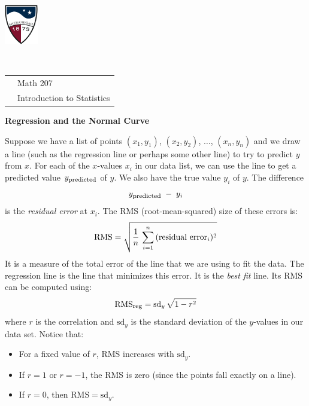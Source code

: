 \documentclass[10pt]{article}
\begin{document}
\pagestyle{empty}
\lstset{language=R, showspaces=false, showstringspaces=false}

\href{http://www.su.edu}{\includegraphics[height=1.75cm]{sulogo.eps}}
\vspace{-1.69cm}

{\small{\ }\hfill
\begin{tabular}{cl}
& Math 207\\
& Introduction to Statistics\\
\end{tabular}
}
\setlength{\baselineskip}{1.05\baselineskip}

\begin{center}
\textbf{\large  Regression and the Normal Curve}
\end{center}
\newcommand{\Z}{\hphantom{0}}
\newcommand{\VP}{\vphantom{\Large Y}}
\newcommand{\M}{\hphantom{$-$}}

Suppose we have a list of points $(x_1, y_1)$, $(x_2, y_2)$, $\dots$, $(x_n, y_n)$
and we draw a line (such as the regression line or perhaps some other line) to 
try to predict $y$ from $x$.  
For each of the $x$-values
$x_i$ in our data list, we can use the  line to get a  predicted value 
 $y_{\mbox{\footnotesize predicted}}$ of $y$.  
We also have the true value $y_i$ of $y$.  
The difference\vspace{-3pt}
\[y_{\mbox{\footnotesize predicted}} \; -\; y_i\vspace{-3pt}\]
is the \textit{residual error} at $x_i$.  
The  RMS (root-mean-squared) size of these errors is:\vspace{-3pt}
\[\mbox{RMS} = \sqrt{\frac{1}{n}\,\sum_{i=1}^n\,(\mbox{residual error}_i)^2}\vspace{-3pt}\]
It is a measure of the total error of the line that we are using  to fit the data.
The regression line is the line that minimizes this error.  
It is the \textit{best fit} line.
Its RMS can be computed using:\vspace{-3pt}
\[\mbox{RMS}_{\mbox{\footnotesize reg}} = \mbox{sd}_y\,\sqrt{1-r^2}\vspace{-3pt}\]
where $r$ is the correlation and $\mbox{sd}_y$ is the standard deviation of the $y$-values
in our data set.
Notice that:
\begin{itemize}
\item For a fixed value of $r$, RMS increases with $\mbox{sd}_y$.
\item If $r=1$ or $r=-1$, the RMS is zero (since the points fall exactly on a line).
\item If $r=0$, then $\mbox{RMS}=\mbox{sd}_y$.
\end{itemize}
\end{document}
